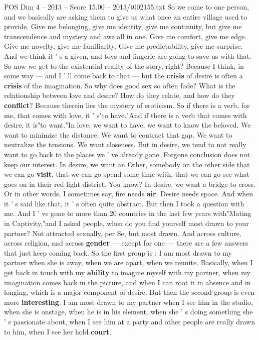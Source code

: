 \begin{textsample}{POS Dim 4 – 2013 – Score 15.00 – 2013/t002155.txt}
So we come to one person, and we basically are asking them to give us what once an entire village used to provide.
Give me belonging, give me identity, give me continuity, but give me transcendence and mystery and awe all in one.
Give me comfort, give me edge.
Give me novelty, give me familiarity.
Give me predictability, give me surprise.
And we think it ' s a given, and toys and lingerie are going to save us with that.
So now we get to the existential reality of the story, right?
Because I think, in some way — and I ' ll come back to that — but the \textbf{crisis} of desire is often a \textbf{crisis} of the imagination.
So why does good sex so often fade?
What is the relationship between love and desire?
How do they relate, and how do they \textbf{conflict}?
Because therein lies the mystery of eroticism.
So if there is a verb, for me, that comes with love, it ' s"to have."And if there is a verb that comes with desire, it is"to want."In love, we want to have, we want to know the beloved.
We want to minimize the distance.
We want to contract that gap.
We want to neutralize the tensions.
We want closeness.
But in desire, we tend to not really want to go back to the places we ' ve already gone.
Forgone conclusion does not keep our interest.
In desire, we want an Other, somebody on the other side that we can go \textbf{visit}, that we can go spend some time with, that we can go see what goes on in their red-light district.
You know?
In desire, we want a bridge to cross.
Or in other words, I sometimes say, fire needs \textbf{air}.
Desire needs space.
And when it ' s said like that, it ' s often quite abstract.
But then I took a question with me.
And I ' ve gone to more than 20 countries in the last few years with"Mating in Captivity,"and I asked people, when do you find yourself most drawn to your partner?
Not attracted sexually, per Se, but most drawn.
And across culture, across religion, and across \textbf{gender} — except for one — there are a few answers that just keep coming back.
So the first group is : I am most drawn to my partner when she is away, when we are apart, when we reunite.
Basically, when I get back in touch with my \textbf{ability} to imagine myself with my partner, when my imagination comes back in the picture, and when I can root it in absence and in longing, which is a major component of desire.
But then the second group is even more \textbf{interesting}.
I am most drawn to my partner when I see him in the studio, when she is onstage, when he is in his element, when she ' s doing something she ' s passionate about, when I see him at a party and other people are really drawn to him, when I see her hold \textbf{court}.

\end{textsample}
